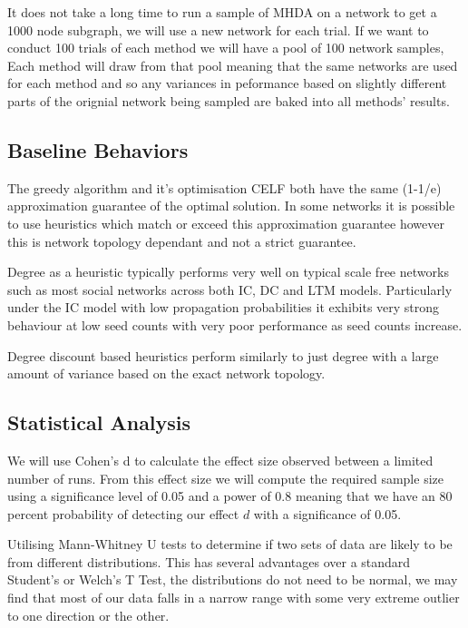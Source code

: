 \documentclass{article}
\begin{document}
It does not take a long time to run a sample of MHDA on a network to get a 1000 node subgraph, we will use a new network for each trial.
If we want to conduct 100 trials of each method we will have a pool of 100 network samples, Each method will draw from that pool meaning that the same networks are used for each method and so any variances in peformance based on slightly different parts of the orignial network being sampled are baked into all methods' results.

\subsection{Baseline Behaviors}

The greedy algorithm and it's optimisation CELF both have the same (1-1/e) approximation guarantee of the optimal solution.
In some networks it is possible to use heuristics which match or exceed this approximation guarantee however this is network topology dependant and not a strict guarantee.

Degree as a heuristic typically performs very well on typical scale free networks such as most social networks across both IC, DC and LTM models. Particularly under the IC model with low propagation probabilities it exhibits very strong behaviour at low seed counts with very poor performance as seed counts increase.

Degree discount based heuristics perform similarly to just degree with a large amount of variance based on the exact network topology.


\subsection{Statistical Analysis}
We will use Cohen's d to calculate the effect size observed between a limited number of runs.
From this effect size we will compute the required sample size using a significance level of 0.05 and a power of 0.8 meaning that we have an 80 percent probability of detecting our effect $d$ with a significance of 0.05.

Utilising Mann-Whitney U tests to determine if two sets of data are likely to be from different distributions.
This has several advantages over a standard Student's or Welch's T Test, the distributions do not need to be normal, we may find that most of our data falls in a narrow range with some very extreme outlier to one direction or the other.
\\
\end{document}
